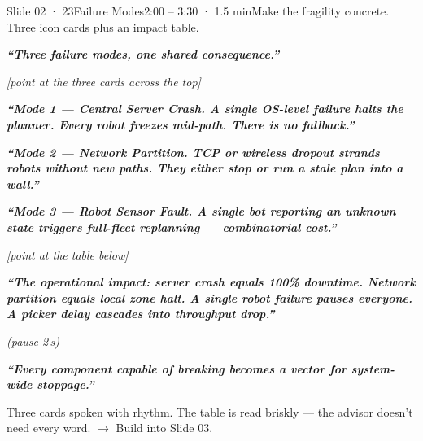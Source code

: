 \documentclass[11pt,a4paper]{article}
\newcommand{\say}[1]{%
    \par\vspace{0.3em}%
    \begingroup
    \leftskip=12pt
    \rightskip=8pt
    \color{thStrong}%
    \itshape\textbf{“#1”}%
    \par
    \endgroup
    \vspace{0.2em}
}
\newcommand{\beat}[1][2]{%
    \par\textcolor{thMuted}{\small\textit{(pause #1\,s)}}\par
    \vspace{0.2em}
}
\newcommand{\stage}[1]{%
    \par\textcolor{thMuted}{\small\textit{[#1]}}\par
    \vspace{0.2em}
}
\newcommand{\emphcoral}[1]{\textbf{\textcolor{thCoral}{#1}}}
\begin{document}
\begin{slide}{Slide 02 · 23}{Failure Modes}{2:00 – 3:30 · 1.5 min}{Make the fragility concrete. Three icon cards plus an impact table.}
\say{Three failure modes, one shared consequence.}

\stage{point at the three cards across the top}

\say{\emphcoral{Mode 1 — Central Server Crash.} A single OS-level failure halts the planner. Every robot freezes mid-path. There is no fallback.}

\say{\emphcoral{Mode 2 — Network Partition.} TCP or wireless dropout strands robots without new paths. They either stop or run a stale plan into a wall.}

\say{\emphcoral{Mode 3 — Robot Sensor Fault.} A single bot reporting an unknown state triggers full-fleet replanning — combinatorial cost.}

\stage{point at the table below}

\say{The operational impact: server crash equals \textbf{100\% downtime}. Network partition equals \textbf{local zone halt}. A single robot failure pauses \textbf{everyone}. A picker delay cascades into \textbf{throughput drop}.}
\beat
\say{Every component capable of breaking becomes a vector for \textbf{system-wide stoppage}.}

\begin{stagebox}
Three cards spoken with rhythm. The table is read briskly — the advisor doesn't need every word. $\rightarrow$ Build into Slide 03.
\end{stagebox}
\end{slide}
\end{document}
